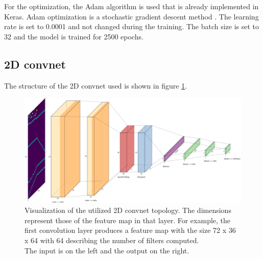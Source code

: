 For the optimization, the Adam algorithm is used that is already implemented in Keras. Adam optimization is a stochastic gradient descent method \cite{keras}. The learning rate is set to 0.0001 and not changed during the training. The batch size is set to 32 and the model is trained for 2500 epochs. 


\newpage

\subsection{2D convnet}
\label{2d_cnn}
The structure of the 2D convnet used is shown in figure \ref{fig:2dCnnStructure}.
\begin{figure}[H]
	\centering
	\includegraphics[width=15cm]{images/2dCnnStructure_new.png}
	\caption[Visualization of the utilized 2D convnet topology.]{Visualization of the utilized 2D convnet topology. The dimensions represent those of the feature map in that layer. For example, the first convolution layer produces a feature map with the size 72 x 36 x 64 with 64 describing the number of filters computed.\\ The input is on the left and the output on the right.}
	\label{fig:2dCnnStructure}
\end{figure}
